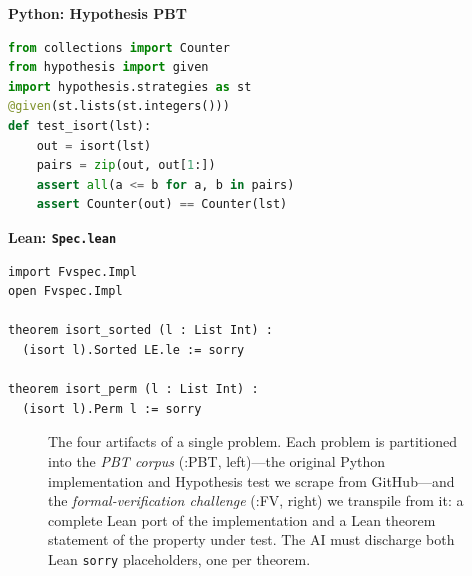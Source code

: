 \begin{lrbox}{\fvspecPyPbtBox}%
\begin{minipage}{0.36\linewidth}
{\small\sffamily\textbf{Python: Hypothesis PBT}}\par\smallskip
\begin{lstlisting}[style=code, language=Python, basicstyle=\ttfamily\scriptsize]
from collections import Counter
from hypothesis import given
import hypothesis.strategies as st
@given(st.lists(st.integers()))
def test_isort(lst):
    out = isort(lst)
    pairs = zip(out, out[1:])
    assert all(a <= b for a, b in pairs)
    assert Counter(out) == Counter(lst)
\end{lstlisting}
\end{minipage}%
\end{lrbox}%

\begin{lrbox}{\fvspecSpecBox}%
\begin{minipage}{0.46\linewidth}
{\small\sffamily\textbf{Lean: \texttt{Spec.lean}}}\par\smallskip
\begin{lstlisting}[style=code, language=Lean, basicstyle=\ttfamily\scriptsize]
import Fvspec.Impl
open Fvspec.Impl

theorem isort_sorted (l : List Int) :
  (isort l).Sorted LE.le := sorry

theorem isort_perm (l : List Int) :
  (isort l).Perm l := sorry
\end{lstlisting}
\end{minipage}%
\end{lrbox}%

\begin{figure}[h]
\centering
{}
\caption{The four artifacts of a single \FVSpec problem. Each problem is
partitioned into the \emph{PBT corpus} (\FVSpec:PBT, left)---the original
Python implementation and Hypothesis test we scrape from GitHub---and the
\emph{formal-verification challenge} (\FVSpec:FV, right) we transpile from
it: a complete Lean port of the implementation and a Lean theorem statement
of the property under test. The AI must discharge both Lean \texttt{sorry}
placeholders, one per theorem.}
\label{fig:running-example}
\end{figure}

